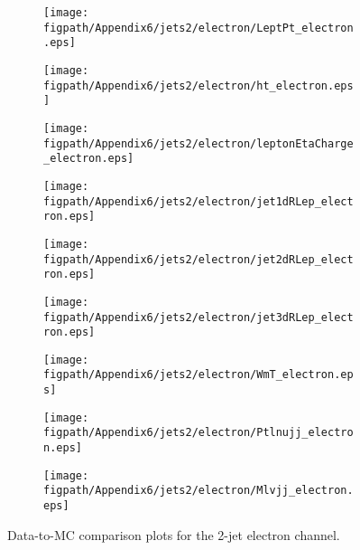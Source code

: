 \begin{figure}[!hbtp]
    \centering
    \begin{subfigure}[t]{0.317\textwidth}
        \texttt{[image: \\figpath/Appendix6/jets2/electron/LeptPt\_electron.eps]}
    \end{subfigure}
    \begin{subfigure}[t]{0.317\textwidth}
        \texttt{[image: \\figpath/Appendix6/jets2/electron/ht\_electron.eps]}
    \end{subfigure}
    \begin{subfigure}[t]{0.317\textwidth}
        \texttt{[image: \\figpath/Appendix6/jets2/electron/leptonEtaCharge\_electron.eps]}
    \end{subfigure}

    \begin{subfigure}[t]{0.317\textwidth}
        \texttt{[image: \\figpath/Appendix6/jets2/electron/jet1dRLep\_electron.eps]}
    \end{subfigure}
    \begin{subfigure}[t]{0.317\textwidth}
        \texttt{[image: \\figpath/Appendix6/jets2/electron/jet2dRLep\_electron.eps]}
    \end{subfigure}
    \begin{subfigure}[t]{0.317\textwidth}
        \texttt{[image: \\figpath/Appendix6/jets2/electron/jet3dRLep\_electron.eps]}
    \end{subfigure}

    \begin{subfigure}[t]{0.317\textwidth}
        \texttt{[image: \\figpath/Appendix6/jets2/electron/WmT\_electron.eps]}
    \end{subfigure}
    \begin{subfigure}[t]{0.317\textwidth}
        \texttt{[image: \\figpath/Appendix6/jets2/electron/Ptlnujj\_electron.eps]}
    \end{subfigure}
    \begin{subfigure}[t]{0.317\textwidth}
        \texttt{[image: \\figpath/Appendix6/jets2/electron/Mlvjj\_electron.eps]}
    \end{subfigure}
    \caption{Data-to-MC comparison plots for the 2-jet electron channel.}
    \label{fig:comparison_plots_jets2_electron_2}
\end{figure}
















